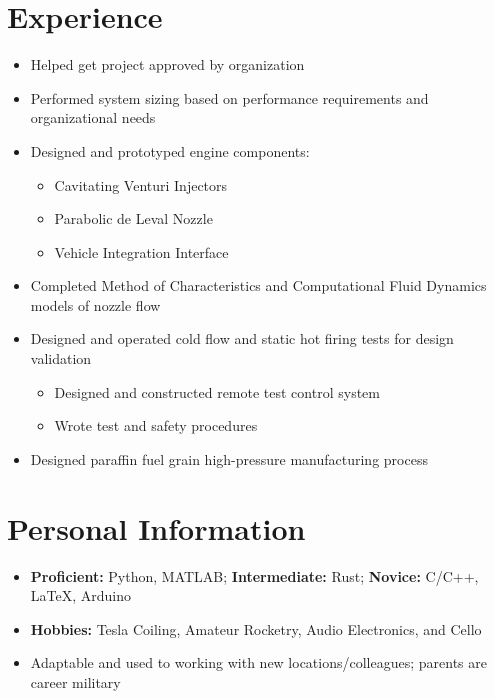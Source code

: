 \documentclass[11pt]{moderncv}
\begin{document}
\section{Experience}
\begin{itemize}
\item Helped get project approved by organization
\item Performed system sizing based on performance requirements and organizational needs
\item Designed and prototyped engine components:
      \begin{itemize}
      \item Cavitating Venturi Injectors
      \item Parabolic de Leval Nozzle
      \item Vehicle Integration Interface
      \end{itemize}
\item Completed Method of Characteristics and Computational Fluid Dynamics models of nozzle flow
\item Designed and operated cold flow and static hot firing tests for design validation
      \begin{itemize}
      \item Designed and constructed remote test control system
      \item Wrote test and safety procedures
      \end{itemize}
\item Designed paraffin fuel grain high-pressure manufacturing process
\end{itemize}

\section{Personal Information}
\begin{itemize}
\item \textbf{Proficient:} Python, MATLAB; \textbf{Intermediate:} Rust; \textbf{Novice:} C/C++, \LaTeX, Arduino
\item \textbf{Hobbies:} Tesla Coiling, Amateur Rocketry, Audio Electronics, and Cello
\item Adaptable and used to working with new locations/colleagues; parents are career military
\end{itemize}
\end{document}
